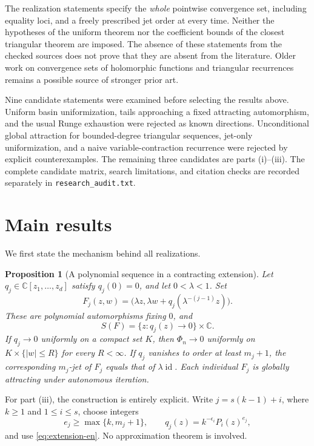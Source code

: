\documentclass[12pt]{amsart}
\newtheorem{prop}[thm]{Proposition}
\theoremstyle{definition}
\theoremstyle{remark}
\numberwithin{equation}{section}
\DeclareMathOperator{\id}{id}
\newcommand{\C}{\mathbb{C}}
\begin{document}
The realization statements specify the \emph{whole} pointwise convergence set, including equality loci, and a freely prescribed jet order at every time. Neither the hypotheses of the uniform theorem nor the coefficient bounds of the closest triangular theorem are imposed. The absence of these statements from the checked sources does not prove that they are absent from the literature. Older work on convergence sets of holomorphic functions and triangular recurrences remains a possible source of stronger prior art.

Nine candidate statements were examined before selecting the results above. Uniform basin uniformization, tails approaching a fixed attracting automorphism, and the usual Runge exhaustion were rejected as known directions. Unconditional global attraction for bounded-degree triangular sequences, jet-only uniformization, and a naive variable-contraction recurrence were rejected by explicit counterexamples. The remaining three candidates are parts (i)--(iii). The complete candidate matrix, search limitations, and citation checks are recorded separately in \texttt{research\_audit.txt}.

\section{Main results}
We first state the mechanism behind all realizations.

\begin{prop}[A polynomial sequence in a contracting extension]\label{prop:transfer-en}
Let $q_j\in\C[z_1,\ldots,z_d]$ satisfy $q_j(0)=0$, and let $0<\lambda<1$. Set
\begin{equation}\label{eq:extension-en}
F_j(z,w)=\bigl(\lambda z,\lambda w+q_j(\lambda^{-(j-1)}z)\bigr).
\end{equation}
These are polynomial automorphisms fixing $0$, and
\begin{equation}\label{eq:transfer-en}
S(F)=\{z:q_j(z)\longrightarrow0\}\times\C.
\end{equation}
If $q_j\to0$ uniformly on a compact set $K$, then $\Phi_n\to0$ uniformly on $K\times\{|w|\leq R\}$ for every $R<\infty$. If $q_j$ vanishes to order at least $m_j+1$, the corresponding $m_j$-jet of $F_j$ equals that of $\lambda\id$. Each individual $F_j$ is globally attracting under autonomous iteration.
\end{prop}

For part (iii), the construction is entirely explicit. Write $j=s(k-1)+i$, where $k\geq1$ and $1\leq i\leq s$, choose integers
\begin{equation}\label{eq:exponents-en}
e_j\geq\max\{k,m_j+1\},\qquad
q_j(z)=k^{-\epsilon_i}P_i(z)^{e_j},
\end{equation}
and use \eqref{eq:extension-en}. No approximation theorem is involved.
\end{document}
